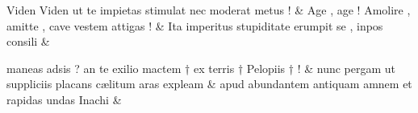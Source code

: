 \documentclass[12pt,onecolumn,twoside,a4paper]{memoir}
\begin{document}
\begin{pairs}
\begin{Leftside}
                              Viden
                              {Viden}
                              ut
                              te
                              impietas
                              stimulat
                              nec
                              moderat
                              metus
                              ! \&
                         \stanza {}
                     Age
                              ,
                              age
                              !
                              Amolire
                              ,
                              amitte
                              ,
                              cave
                              vestem
                              attigas
                              ! \&
                         \stanza {}
                     Ita
                              imperitus
                              stupiditate
                              erumpit
                              se
                              ,
                              inpos
                              consili \&
                         \stanza {}
                     
                              maneas
                              adsis
                              ?
                              an
                              te
                              exilio
                              mactem
                              †
                              ex
                              terris
                              †
                              Pelopiis
                              †
                              ! \&
                         \stanza {}
                     nunc
                              pergam
                              ut
                              suppliciis
                              placans
                              cælitum
                              aras
                              expleam \&
                         \stanza {}
                     apud
                              abundantem
                              antiquam
                              amnem
                              et
                              rapidas
                              undas
                              Inachi \&


\end{Leftside}
\end{pairs}
\end{document}
